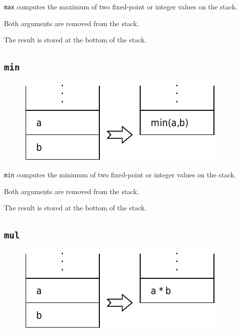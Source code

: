 			\texttt{max} computes the maximum of two fixed-point or integer
			values on the stack. 
	
			Both arguments are removed from the stack. 
	
			The result is stored at the bottom of the stack.
	
	\qquad
	
	\subsection*{\texttt{min}}
	
		\begin{figure}
			\begin{flushright}
				\includegraphics[width=\linewidth]{figure/pdf/i_min} 
			\end{flushright}
		\end{figure}
	
			\texttt{min} computes the minimum of two fixed-point or integer
			values on the stack. 
	
			Both arguments are removed from the stack. 
	
			The result is stored at the bottom of the stack.
	
	\qquad
	
	\subsection*{\texttt{mul}}
	
		\begin{figure}
			\begin{flushright}
				\includegraphics[width=\linewidth]{figure/pdf/i_mul} 
			\end{flushright}
		\end{figure}
	
